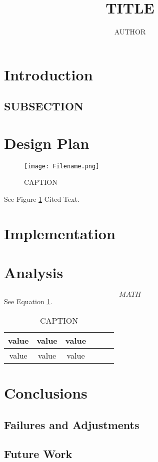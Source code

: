 \documentclass[12pt, titlepage]{article}
\begin{document}
\title{TITLE}
\author{AUTHOR}

\maketitle

\section{Introduction}
\subsection{SUBSECTION}
\newpage
\section{Design Plan}
\begin{figure}[tbh!]
	\texttt{[image: Filename.png]}
	\caption{CAPTION}
	\label{fig:LABEL}
\end{figure}
See Figure \ref{fig:LABEL}
Cited Text\cite{citation}. 
\section{Implementation}
\section{Analysis}
\begin{equation} 
	MATH
	\label{LABEL}
\end{equation}
See Equation \ref{LABEL}.

\begin{table}[tbh!]
	\centering
	\begin{tabular}{|c|c|c|c|c|c|}
		\hline
		value&value&value\\
		\hline
		value&value&value\\
		\hline
	\end{tabular}
	\caption{CAPTION}
	\label{LABEL}
\end{table}
\section{Conclusions}
\subsection{Failures and Adjustments}
\subsection{Future Work}
\newpage
\section{}
\printbibliography
\newpage
\end{document}
